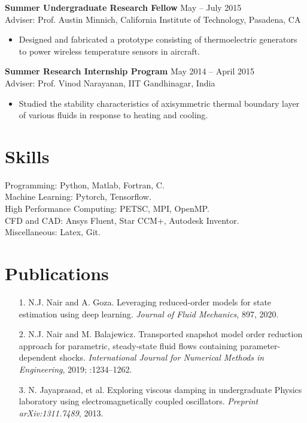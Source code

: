 \documentclass[margin]{res}
\begin{document}
\begin{resume}
{\bf Summer Undergraduate Research Fellow} \hfill May -- July 2015\\
Adviser: Prof. Austin Minnich, California Institute of Technology, Pasadena, CA
\begin{itemize}
\item Designed and fabricated a prototype consisting of thermoelectric generators to
power wireless temperature sensors in aircraft.
\end{itemize}

{\bf Summer Research Internship Program} \hfill   May 2014 -- April 2015\\
Adviser: Prof. Vinod Narayanan, IIT Gandhinagar, India
\begin{itemize}
\item Studied the stability characteristics of axisymmetric thermal boundary layer of various fluids in response to heating and cooling.
\end{itemize}


\section{\large Skills}		 
Programming: Python, Matlab, Fortran, C.\\
Machine Learning: Pytorch, Tensorflow.\\
High Performance Computing: PETSC, MPI, OpenMP.\\
CFD and CAD: Ansys Fluent, Star CCM+, Autodesk Inventor.\\ 
Miscellaneous: Latex, Git.

\section{\large Publications}
 \begin{itemize}
 \item[1.] N.J. Nair and A. Goza. Leveraging reduced-order models for state estimation using deep learning. \textit{Journal of Fluid Mechanics}, 897, 2020.
 
 \item[2.] N.J. Nair and M. Balajewicz. Transported snapshot model order reduction approach for parametric, steady-state fluid flows containing parameter-dependent shocks. \textit{International Journal for Numerical Methods in Engineering}, 2019; :1234–1262.
 
  \item[3.] N. Jayaprasad, et al. Exploring viscous damping in undergraduate Physics laboratory using electromagnetically coupled oscillators. \textit{Preprint arXiv:1311.7489}, 2013.
 \end{itemize}
 

\end{resume}
\end{document}
